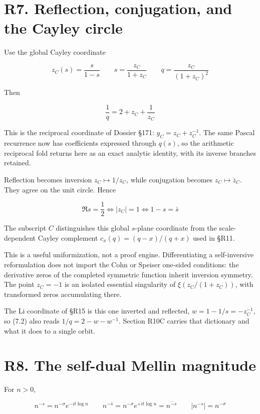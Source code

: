 \documentclass[
  11pt,
]{book}
\begin{document}
\section{R7. Reflection, conjugation, and the Cayley
circle}\label{r7.-reflection-conjugation-and-the-cayley-circle}

Use the global Cayley coordinate

\[
z_C(s)=\frac{s}{1-s}
\qquad
s=\frac{z_C}{1+z_C}
\qquad
q=\frac{z_C}{(1+z_C)^2}
\tag{7.1}
\]

Then

\[
\boxed{\frac1q=2+z_C+\frac1{z_C}}
\tag{7.2}
\]

This is the reciprocal coordinate of Dossier §171: \(y_C=z_C+z_C^{-1}\).
The same Pascal recurrence now has coefficients expressed through
\(q(s)\), so the arithmetic reciprocal fold returns here as an exact
analytic identity, with its inverse branches retained.

Reflection becomes inversion \(z_C\mapsto1/z_C\), while conjugation
becomes \(z_C\mapsto\bar z_C\). They agree on the unit circle. Hence

\[
\Re s=\frac12
\iff |z_C|=1
\iff 1-s=\bar s
\tag{7.3}
\]

The subscript \(C\) distinguishes this global \(s\)-plane coordinate
from the scale-dependent Cayley complement \(c_x(q)=(q-x)/(q+x)\) used
in §R11.

This is a useful uniformization, not a proof engine. Differentiating a
self-inversive reformulation does not import the Cohn or Speiser
one-sided conditions: the derivative zeros of the completed symmetric
function inherit inversion symmetry. The point \(z_C=-1\) is an isolated
essential singularity of \(\xi(z_C/(1+z_C))\), with transformed zeros
accumulating there.

The Li coordinate of §R15 is this one inverted and reflected,
\(w=1-1/s=-z_C^{-1}\), so (7.2) also reads \(1/q=2-w-w^{-1}\). Section
R10C carries that dictionary and what it does to a single orbit.

\section{R8. The self-dual Mellin
magnitude}\label{r8.-the-self-dual-mellin-magnitude}

For \(n>0\),

\[
n^{-s}=n^{-\sigma}e^{-it\log n}
\qquad
n^{-\bar s}=n^{-\sigma}e^{+it\log n}
=\overline{n^{-s}}
\qquad
\left|n^{-s}\right|=n^{-\sigma}
\tag{8.1}
\]
\end{document}
